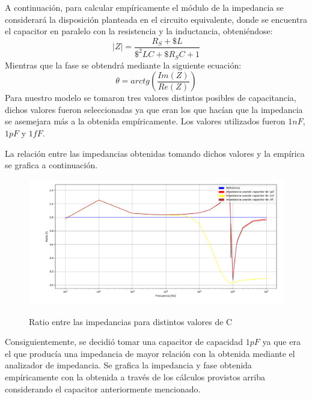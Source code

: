 A continuación, para calcular empíricamente el módulo de la impedancia se considerará la disposición planteada en el circuito equivalente, donde se encuentra el capacitor en paralelo con la resistencia y la inductancia, obteniéndose: 
\begin{equation}
|Z|= \frac{R_S+\$L}{\$^2LC+\$R_SC+1}
\end{equation}
Mientras que la fase se obtendrá mediante la siguiente ecuación:
\begin{equation}
\theta= arctg(\frac{Im(Z)}{Re(Z)})
\end{equation}
Para nuestro modelo se tomaron tres valores distintos posibles de capacitancia, dichos valores fueron seleccionadas ya que eran los que hacían que la impedancia se asemejara más a la obtenida empíricamente. Los valores utilizados fueron $1nF$, $1pF$ y $1fF$.

La relación entre las impedancias obtenidas tomando dichos valores y la empírica se grafica a continuación.

\begin{figure}[H]
\centering
\includegraphics[width=1\textwidth]{Ejercicio_1(Germo)/Grafico/relacionZs.png}
\label{fig:relacionZs}
\caption{Ratio entre las impedancias para distintos valores de C}
\end{figure}


Consiguientemente, se decidió tomar una capacitor de capacidad $1pF$ ya que era el que producía una impedancia de mayor relación con la obtenida mediante el analizador de impedancia. Se grafica la impedancia y fase obtenida empíricamente con la obtenida a través de los cálculos provistos arriba considerando el capacitor anteriormente mencionado.

